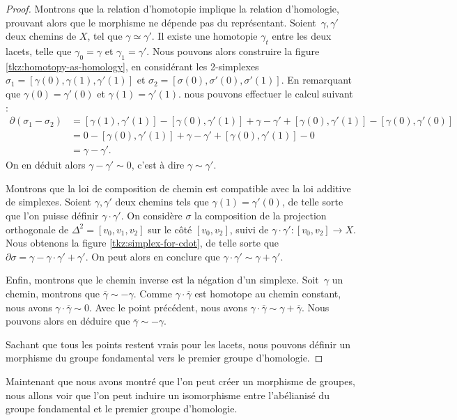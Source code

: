 \begin{proof}
Montrons que la relation d'homotopie implique la relation d'homologie, prouvant alors que le morphisme ne dépende pas du représentant. Soient~$\gamma,\gamma'$ deux chemins de $X$, tel que $\gamma\simeq \gamma'$. Il existe une homotopie $\gamma_t$ entre les deux lacets, telle que $\gamma_0=\gamma$ et $\gamma_1=\gamma'$. Nous pouvons alors construire la figure \ref{tkz:homotopy-as-homology}, en considérant les 2-simplexes $\sigma_1=[\gamma(0),\gamma(1),\gamma'(1)]$ et $\sigma_2=[\sigma(0), \sigma'(0),\sigma'(1)]$. En remarquant que $\gamma(0)=\gamma'(0)$ et $\gamma(1)=\gamma'(1)$. nous pouvons effectuer le calcul suivant : \[\begin{split}
\partial(\sigma_1-\sigma_2)&=[\gamma(1),\gamma'(1)]-[\gamma(0),\gamma'(1)]+\gamma-\gamma'+[\gamma(0),\gamma'(1)]-[\gamma(0),\gamma'(0)]\\
&=0-[\gamma(0),\gamma'(1)]+\gamma-\gamma'+[\gamma(0),\gamma'(1)]-0\\
&=\gamma-\gamma'.
\end{split}\]On en déduit alors $\gamma-\gamma'\sim 0$, c'est à dire $\gamma\sim \gamma'$.

\bigskip Montrons que la loi de composition de chemin est compatible avec la loi additive de simplexes. Soient $\gamma,\gamma'$ deux chemins tels que $\gamma(1)=\gamma'(0)$, de telle sorte que l'on puisse définir $\gamma\cdot\gamma'$. On considère $\sigma$ la composition de la projection orthogonale de $\Delta^2=[v_0,v_1,v_2]$ sur le côté $[v_0,v_2]$, suivi de $\gamma\cdot\gamma':[v_0,v_2]\to X$. Nous obtenons la figure \ref{tkz:simplex-for-cdot}, de telle sorte que $\partial \sigma=\gamma-\gamma\cdot\gamma'+\gamma'$. On peut alors en conclure que $\gamma\cdot\gamma'\sim \gamma+\gamma'$.

\bigskip Enfin, montrons que le chemin inverse est la négation d'un simplexe. Soit~$\gamma$ un chemin, montrons que $\overline{\gamma}\sim -\gamma$. Comme $\gamma\cdot\overline{\gamma}$ est homotope au chemin constant, nous avons $\gamma\cdot\overline{\gamma}\sim 0$. Avec le point précédent, nous avons $\gamma\cdot\overline{\gamma}\sim \gamma+\overline{\gamma}$. Nous pouvons alors en déduire que $\overline{\gamma}\sim -\gamma$.

\bigskip Sachant que tous les points restent vrais pour les lacets, nous pouvons définir un morphisme du groupe fondamental vers le premier groupe d'homologie.
\end{proof}

Maintenant que nous avons montré que l'on peut créer un morphisme de groupes, nous allons voir que l'on peut induire un isomorphisme entre l'abélianisé du groupe fondamental et le premier groupe d'homologie.


